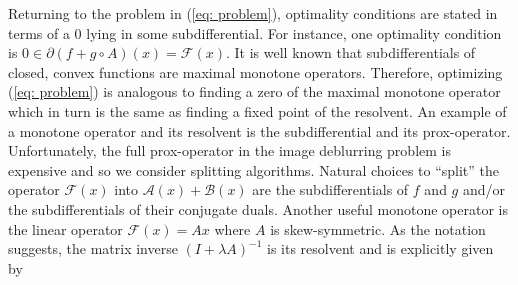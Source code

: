 \documentclass[12pt]{article}
\begin{document}
Returning to the problem in (\ref{eq: problem}), optimality conditions
are stated in terms of a $0$ lying in some
subdifferential. For instance, one optimality condition is $0
\in \partial (f + g \circ A)(x) = \mathcal{F}(x)$. It is well known that subdifferentials of closed,
convex functions are maximal monotone operators. Therefore, optimizing
(\ref{eq: problem}) is analogous to finding a zero of the maximal
monotone operator which in turn is the
same as finding a fixed point of the resolvent. An example of a
monotone operator and its resolvent is the subdifferential and its
prox-operator. Unfortunately, the full prox-operator in the image
deblurring problem is expensive and so we
consider splitting algorithms. Natural choices to ``split'' the operator
$\mathcal{F}(x)$ into $\mathcal{A}(x) +
\mathcal{B}(x)$ are the subdifferentials of $f$ and $g$
and/or the subdifferentials of their conjugate duals. 
Another useful monotone
operator is the linear operator $\mathcal{F}(x) = Ax$ where $A$ is
skew-symmetric. As the notation suggests, the matrix inverse $(I +
\lambda A)^{-1}$ is its resolvent and is explicitly given by 
\end{document}
